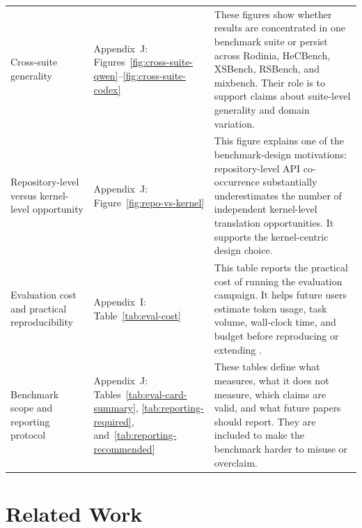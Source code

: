 \begin{center}
\begin{tabularx}{0.98\textwidth}{@{}
>{\RaggedRight\arraybackslash}p{}
>{\RaggedRight\arraybackslash}p{}
X
@{}}
Cross-suite generality
&
Appendix~J:
Figures~\ref{fig:cross-suite-qwen}--\ref{fig:cross-suite-codex}
&
These figures show whether results are concentrated in one benchmark suite or
persist across Rodinia, HeCBench, XSBench, RSBench, and mixbench. Their role is to
support claims about suite-level generality and domain variation. \\

Repository-level versus kernel-level opportunity
&
Appendix~J:
Figure~\ref{fig:repo-vs-kernel}
&
This figure explains one of the benchmark-design motivations: repository-level API
co-occurrence substantially underestimates the number of independent kernel-level
translation opportunities. It supports the kernel-centric design choice. \\

Evaluation cost and practical reproducibility
&
Appendix~I:
Table~\ref{tab:eval-cost}
&
This table reports the practical cost of running the evaluation campaign. It helps
future users estimate token usage, task volume, wall-clock time, and budget before
reproducing or extending \parbench{}. \\

Benchmark scope and reporting protocol
&
Appendix~J:
Tables~\ref{tab:eval-card-summary},
\ref{tab:reporting-required}, and~\ref{tab:reporting-recommended}
&
These tables define what \parbench{} measures, what it does not measure, which
claims are valid, and what future papers should report. They are included to make
the benchmark harder to misuse or overclaim. \\

\bottomrule
\end{tabularx}
\end{center}



\section{Related Work}
\label{sec:appendix-d}

